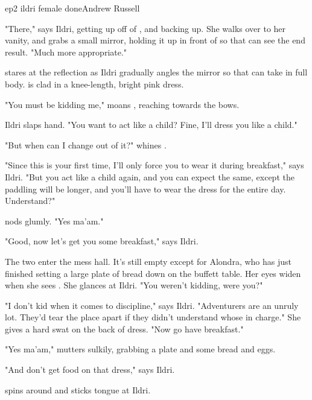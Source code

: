 \documentclass{book}
\begin{document}
\begin{childnode}{ep2 ildri female done}{Andrew Russell}

    "There," says Ildri, getting up off of \name{}, and backing up. She walks over to her vanity, and grabs a small mirror, holding it up in front of \name{} so that \heshe{} can see the end 
    result. "Much more appropriate."

    \name{} stares at the reflection as Ildri gradually angles the mirror so that \name{} can take in \hisher{} full body.  \HeShe{} is clad in a knee-length, bright pink dress. 

    "You must be kidding me," moans \name{}, reaching towards the bows.

    Ildri slaps \names{} hand. "You want to act like a child? Fine, I'll dress you like a child."

    "But when can I change out of it?" whines \name{}.

    "Since this is your first time, I'll only force you to wear it during breakfast," says Ildri. "But you act like a child again, and you can expect the same, except the paddling will be longer,
    and you'll have to wear the dress for the entire day. Understand?"

    \name{} nods glumly. "Yes ma'am."

    "Good, now let's get you some breakfast," says Ildri.

    The two enter the mess hall. It's still empty except for Alondra, who has just finished setting a large plate of bread down on the buffett table. Her eyes widen when she sees \name{}. She glances at Ildri. "You weren't kidding, were you?"

    "I don't kid when it comes to discipline," says Ildri. "Adventurers are an unruly lot. They'd tear the place apart if they didn't understand whose in charge." She gives \name{} a hard
    swat on the back of \hisher{} dress. "Now go have breakfast."

    "Yes ma'am," mutters \name{} sulkily, grabbing a plate and some bread and eggs. 

    "And don't get food on that dress," says Ildri.

    \name{} spins around and sticks \hisher{} tongue at Ildri.


\end{childnode}
\end{document}
